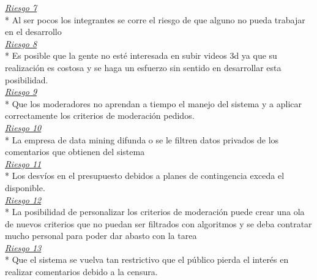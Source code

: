 \newline
\uline{\it{Riesgo 7}}\\*
Al ser pocos los integrantes se corre el riesgo de que alguno no pueda trabajar en el desarrollo\\
\newline
\uline{\it{Riesgo 8}}\\*
Es posible que la gente no esté interesada en subir videos 3d ya que su realización es costosa y se haga un esfuerzo sin sentido en desarrollar esta posibilidad.\\
\newline
\uline{\it{Riesgo 9}}\\*
Que los moderadores no aprendan a tiempo el manejo del sistema y a aplicar correctamente los criterios de moderación pedidos.\\
\newline
\uline{\it{Riesgo 10}}\\*
La empresa de data mining difunda o se le filtren datos privados de los comentarios que obtienen del sistema\\
\newline
\uline{\it{Riesgo 11}}\\*
Los desvíos en el presupuesto debidos a planes de contingencia exceda el disponible.\\
\newline
\uline{\it{Riesgo 12}}\\*
La posibilidad de personalizar los criterios de moderación puede crear una ola de nuevos criterios que no puedan ser filtrados con algoritmos y se deba contratar mucho personal para poder dar abasto con la tarea\\
\newline
\uline{\it{Riesgo 13}}\\*
Que el sistema se vuelva tan restrictivo que el público pierda el interés en realizar comentarios debido a la censura.\\

